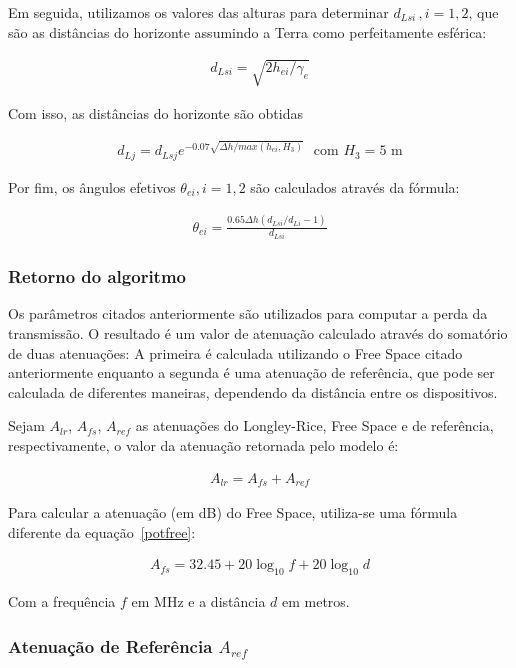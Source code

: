 Em seguida, utilizamos os valores das alturas para determinar $d_{Lsi}\, , i=1,2$, que são as distâncias do horizonte assumindo a Terra como perfeitamente esférica:

\begin{align}
\label{d_lsi} d_{Lsi} = \sqrt{2h_{ei}/\gamma_e}
\end{align}

Com isso, as distâncias do horizonte são obtidas

\begin{align}
\label{d_lj} d_{Lj} = d_{Lsj}e^{-0.07\sqrt{\Delta h / max(h_{ei},H_3)}} \,\,\,\, \text{com $H_3 = 5$ m}
\end{align}

Por fim, os ângulos efetivos $\theta_{ei}, i=1,2$ são calculados através da fórmula:

\begin{align}
\label{oei} 	\theta_{ei} = \frac{0.65\Delta h(d_{Lsi}/d_{Li} -1)}{d_{Lsi}}
\end{align}


\subsubsection{Retorno do algoritmo}

Os parâmetros citados anteriormente são utilizados para computar a perda da transmissão. O resultado é um valor de atenuação calculado através do somatório de duas atenuações: A primeira é calculada utilizando o Free Space citado anteriormente enquanto a segunda é uma atenuação de referência, que pode ser calculada de diferentes maneiras, dependendo da distância entre os dispositivos.

Sejam $A_{lr}$, $A_{fs}$, $A_{ref}$ as atenuações do Longley-Rice, Free Space e de referência, respectivamente, o valor da atenuação retornada pelo modelo é:

\begin{align}
\label{a_lr} A_{lr} = A_{fs} + A_{ref}
\end{align}

Para calcular a atenuação (em dB) do Free Space, utiliza-se uma fórmula diferente da equação~\ref{potfree}:

\begin{align}
\label{a_fs} A_{fs} = 32.45 + 20 \log_{10}f + 20 \log_{10}d 
\end{align}

Com a frequência $f$ em MHz e a distância $d$ em metros.

\subsubsection{Atenuação de Referência $A_{ref}$}

